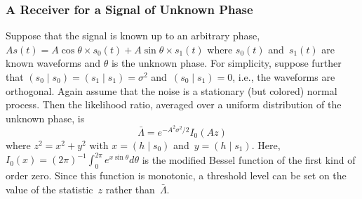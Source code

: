 \subsubsection{A Receiver for a Signal of Unknown Phase}

Suppose that the signal is known up to an arbitrary phase,
$As(t)=A\cos\theta\times s_0(t)+A\sin\theta\times s_1(t)$ where $s_0(t)$
and~$s_1(t)$ are known waveforms and $\theta$ is the unknown phase.
For simplicity, suppose further that $(s_0\mid s_0)=(s_1\mid s_1)=\sigma^2$
and~$(s_0\mid s_1)=0$, i.e., the waveforms are orthogonal.  Again assume that
the noise is a stationary (but colored) normal process.  Then the likelihood
ratio, averaged over a uniform distribution of the unknown phase, is
\begin{equation}
  \bar{\Lambda} = e^{-A^2\sigma^2/2}I_0(Az)
\end{equation}
where $z^2=x^2+y^2$ with $x=(h\mid s_0)$ and~$y=(h\mid s_1)$.  Here,
$I_0(x)=(2\pi)^{-1}\int_0^{2\pi}e^{x\sin\theta}d\theta$ is the modified
Bessel function of the first kind of order zero.  Since this function is
monotonic, a threshold level can be set on the value of the statistic~$z$
rather than~$\bar\Lambda$.

